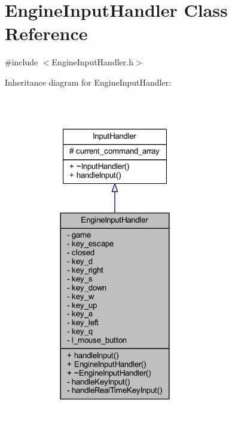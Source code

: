 \hypertarget{class_engine_input_handler}{}\section{Engine\+Input\+Handler Class Reference}
\label{class_engine_input_handler}


{\ttfamily \#include $<$Engine\+Input\+Handler.\+h$>$}



Inheritance diagram for Engine\+Input\+Handler\+:
\nopagebreak
\begin{figure}[H]
\begin{center}
\leavevmode
\includegraphics[width=216pt]{class_engine_input_handler__inherit__graph}
\end{center}
\end{figure}


